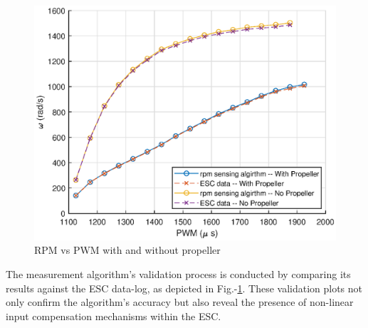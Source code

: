 \begin{figure}[H]
    \centering
    \includegraphics[width = \figsize]{./figs/figs_acc/rpm_feedback/rpm_meas.eps}
    \caption{RPM vs PWM with and without propeller}
    \label{fig::valid}
\end{figure}
The measurement algorithm's validation process is conducted by comparing its results against the ESC data-log, as depicted in Fig.-\ref{fig::valid}. These validation plots not only confirm the algorithm's accuracy but also reveal the presence of non-linear input compensation mechanisms within the ESC.
